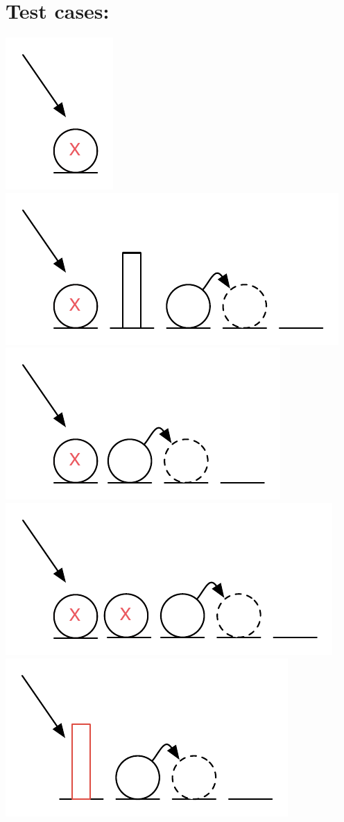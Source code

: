 \documentclass[]{article}
\makeatletter
\def\maxwidth{\ifdim\Gin@nat@width>\linewidth\linewidth
\else\Gin@nat@width\fi}
\let\Oldincludegraphics\includegraphics
\renewcommand{\includegraphics}[1]{\Oldincludegraphics[width=\maxwidth]{#1}}
\makeatother
\begin{document}
\section{Test cases:}

\includegraphics{figs/test1.pdf} \includegraphics{figs/test2.pdf}
\includegraphics{figs/test3.pdf} \includegraphics{figs/test4.pdf}
\includegraphics{figs/test5.pdf}
\end{document}
